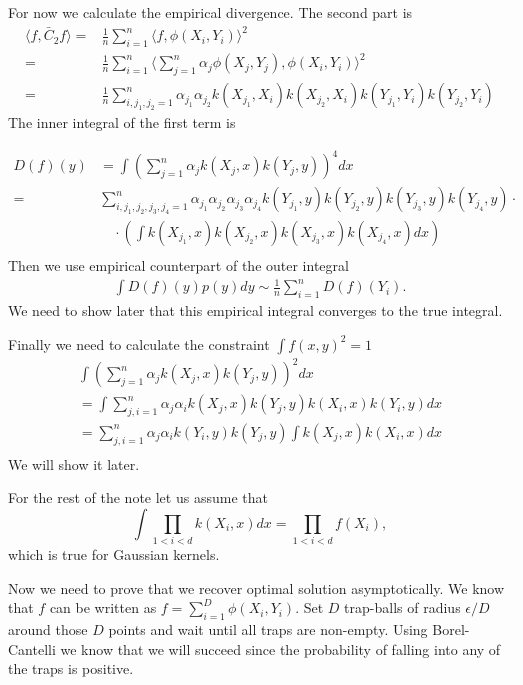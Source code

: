 \documentclass[10pt]{article}
\begin{document}
For now we calculate the empirical divergence. The second part is
\begin{align}
  \langle f, \bar C_2 f \rangle =& \frac 1 n \sum_{i=1}^n \langle f , \phi(X_i,Y_i) \rangle^2 \\
  =& \frac 1 n \sum_{i=1}^n \langle \sum_{j=1}^{n} \alpha_j \phi(X_j,Y_j) , \phi(X_i,Y_i) \rangle^2 \\
   =& \frac 1 n \sum_{i,j_1,j_2=1}^n \alpha_{j_1} \alpha_{j_2} k(X_{j_1},X_i) k(X_{j_2},X_i)  k(Y_{j_1},Y_i) k(Y_{j_2},Y_i) 
\end{align}
The inner integral of the first term is 


\begin{align}
D(f)(y) &=  \int (\sum_{j=1}^{n} \alpha_j k(X_j,x) k(Y_j,y))^4 dx \\
=&  \sum_{i,j_1,j_2,j_3,j_4=1}^n  \alpha_{j_1} \alpha_{j_2} \alpha_{j_3} \alpha_{j_4}  k(Y_{j_1},y) k(Y_{j_2},y)k(Y_{j_3},y)k(Y_{j_4},y) \cdot\\
  &\quad \cdot   \left( \int k(X_{j_1},x) k(X_{j_2},x) k(X_{j_3},x) k(X_{j_4},x)  dx \right) \\     
\end{align}
Then we use empirical counterpart of the outer integral 
\begin{align}
 \int D(f)(y) p(y) dy \sim  \frac 1 n \sum_{i=1}^{n} D(f)(Y_i).
\end{align}
We need to show later that this empirical integral converges to the true integral. 

Finally we need to calculate the constraint $\int f(x,y)^2=1$ 
\begin{align}
 \int \left( \sum_{j=1}^{n} \alpha_j  k(X_{j},x)  k(Y_{j},y) \right )^2 dx \\ 
 = \int  \sum_{j,i=1}^{n} \alpha_j \alpha_i  k(X_{j},x)  k(Y_{j},y) k(X_{i},x)  k(Y_{i},y)  dx\\
 =   \sum_{j,i=1}^{n} \alpha_j \alpha_i  k(Y_{i},y) k(Y_{j},y) \int   k(X_{j},x)   k(X_{i},x)   dx\\ 
\end{align}
 We will show it later. 
 
For the rest of the note let us assume that  
$$
\int \prod_{1<i<d} k(X_i,x) dx   = \prod_{1<i<d}  f(X_i), 
$$
which is true for Gaussian kernels.

Now we need to prove that we recover optimal solution asymptotically. We know that $f$ can be written as $f = \sum_{i=1}^{D} \phi(X_i,Y_i)$. Set $D$ trap-balls of radius $\epsilon/D$ around those $D$ points and wait until all traps are non-empty. Using Borel-Cantelli we know that we will succeed since the probability of falling into any of the traps is positive.          
\end{document}
